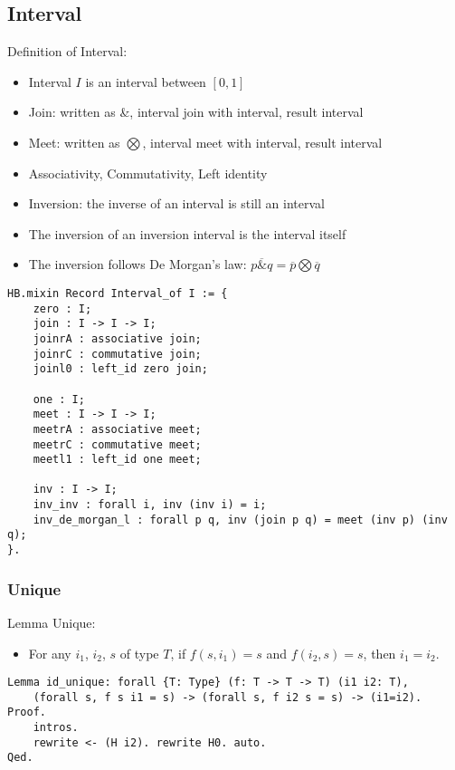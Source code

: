 \documentclass[a4paper,10pt]{article} %
\begin{document}
\subsection{Interval}
Definition of Interval:
\begin{itemize}
    \item Interval \(I\) is an interval between \([0, 1]\)
    \item Join: written as \&, interval join with interval, result interval
    \item Meet: written as \(\bigotimes\), interval meet with interval, result interval
    \item Associativity, Commutativity, Left identity
    \item Inversion: the inverse of an interval is still an interval
    \item The inversion of an inversion interval is the interval itself
    \item The inversion follows De Morgan's law: \(\overline{p \& q} = \overline{p} \bigotimes \overline{q}\)
\end{itemize}
\begin{lstlisting}
HB.mixin Record Interval_of I := {
    zero : I;
    join : I -> I -> I;
    joinrA : associative join;
    joinrC : commutative join;
    joinl0 : left_id zero join;

    one : I;
    meet : I -> I -> I;
    meetrA : associative meet;
    meetrC : commutative meet;
    meetl1 : left_id one meet;

    inv : I -> I;
    inv_inv : forall i, inv (inv i) = i;
    inv_de_morgan_l : forall p q, inv (join p q) = meet (inv p) (inv q);
}.
\end{lstlisting}

\subsubsection{Unique}
Lemma Unique: 
\begin{itemize}
    \item For any \(i_1\), \(i_2\), \(s\) of type \(T\), if \(f(s, i_1) = s\) and \(f(i_2, s) = s\), then \(i_1 = i_2\).
\end{itemize}
\begin{lstlisting}
Lemma id_unique: forall {T: Type} (f: T -> T -> T) (i1 i2: T),
    (forall s, f s i1 = s) -> (forall s, f i2 s = s) -> (i1=i2).
Proof.
    intros.
    rewrite <- (H i2). rewrite H0. auto.
Qed. 
\end{lstlisting}
\end{document}
